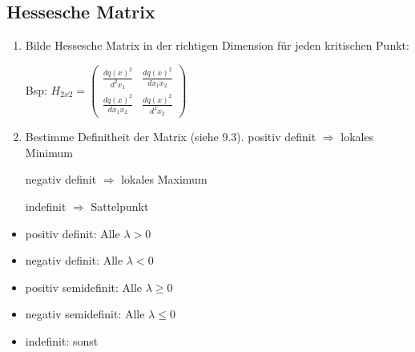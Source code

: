 \subsection{Hessesche Matrix}{
\vskip1pt

\begin{enumerate}
\item Bilde Hessesche Matrix in der richtigen Dimension für jeden kritischen Punkt: \par
Bsp: \hskip10pt$ H_{2x2} = \begin{pmatrix} \frac{dq(x)^2}{d^2 x_1} & \frac{dq(x)^2}{dx_1x_2} \\ \frac{dq(x)^2}{dx_1x_2} & \frac{dq(x)^2}{d^2 x_2} \end{pmatrix}$
\item Bestimme Definitheit der Matrix (siehe 9.3). \vskip2pt
positiv definit $\Longrightarrow$ lokales Minimum\par
negativ definit $\Longrightarrow$ lokales Maximum\par
indefinit $\Longrightarrow$ Sattelpunkt
\end{enumerate}

\begin{center}
\begin{minipage}[c]{0.65 \columnwidth}
\begin{itemize}
\item positiv definit: \hskip27pt Alle $\lambda > 0$
\item negativ definit: \hskip25pt Alle $\lambda < 0$
\item positiv semidefinit: \hskip13pt Alle $\lambda \geq 0$
\item negativ semidefinit: \hskip11pt Alle $\lambda \leq 0$
\item indefinit: \hskip45pt sonst
\end{itemize}
\end{minipage}
\end{center}
\vskip3pt
}